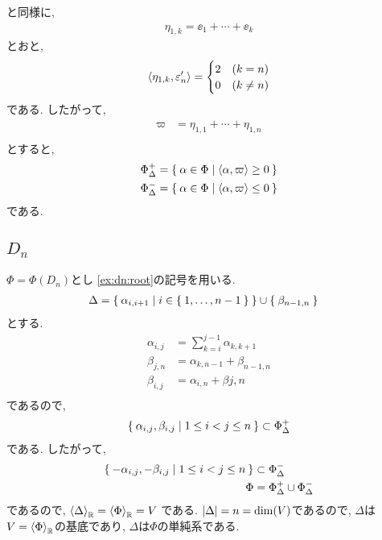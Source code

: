 と同様に,
\begin{align*}
  \eta_{1,k}=\ee_1+\cdots+\ee_k
\end{align*}
とおと,
\begin{align*}
  \Braket{\eta_{1,k},\varepsilon'_{n}}=
  \begin{cases}
    2 &(k=n)\\
    0 &(k\neq n)
  \end{cases}
\end{align*}
である.
したがって,
\begin{align*}
  \varpi&=\eta_{1,1}+\cdots+\eta_{1,n}\\
\end{align*}
  とすると,
\begin{align*}
\Phi_\Delta^+&=\Set{\alpha\in\Phi|\Braket{\alpha,\varpi}\geq 0}\\
\Phi_\Delta^-&=\Set{\alpha\in\Phi|\Braket{\alpha,\varpi}\leq 0}
\end{align*}
である.


\subsection{$D_{n}$}
$\Phi=\Phi(D_n)$とし
\cref{ex:dn:root}の記号を用いる.
\begin{align*}
  \Delta&=\Set{\alpha_{i,i+1}|i\in\Set{1,\ldots,n-1}}\cup \Set{\beta_{n-1,n}}
\end{align*}
とする.
\begin{align*}
\alpha_{i,j}&=\sum_{k=i}^{j-1}\alpha_{k,k+1}\\
\beta_{j,n}&=\alpha_{k,n-1}+\beta_{n-1,n}\\
\beta_{i,j}&=\alpha_{i,n}+\beta{j,n}\\
\end{align*}
であるので, 
\begin{align*}
  \Set{\alpha_{i,j},\beta_{i,j}|1\leq i<j\leq n}\subset\Phi_\Delta^+
\end{align*}
である. したがって,
\begin{align*}
  \Set{-\alpha_{i,j},-\beta_{i,j}|1\leq i<j\leq n}&\subset\Phi_\Delta^-\\
  \Phi&=\Phi_\Delta^+\cup\Phi_\Delta^-
\end{align*}
であるので,
$\Braket{\Delta}_{\mathbb{R}}=\Braket{\Phi}_{\mathbb{R}}=V$
である.
$\left|\Delta\right|=n=\dim(V)$であるので, $\Delta$は$V=\Braket{\Phi}_{\mathbb{R}}$の基底であり,
$\Delta$は$\Phi$の単純系である.


